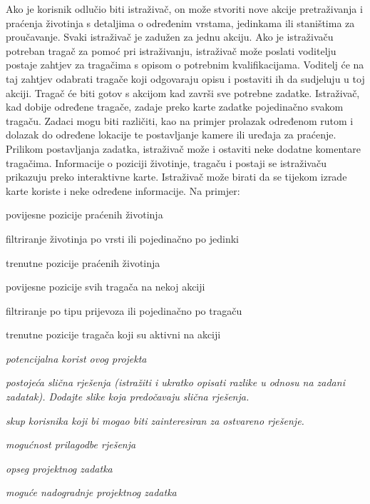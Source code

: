 	Ako je korisnik odlučio biti istraživač, on može stvoriti nove akcije pretraživanja i praćenja životinja s detaljima o određenim vrstama, jedinkama ili staništima za proučavanje.
	Svaki istraživač je zadužen za jednu akciju.
	Ako je istraživaču potreban tragač za pomoć pri istraživanju, istraživač može poslati voditelju postaje zahtjev za tragačima s opisom o potrebnim kvalifikacijama.
	Voditelj će na taj zahtjev odabrati tragače koji odgovaraju opisu i postaviti ih da sudjeluju u toj akciji.
	Tragač će biti gotov s akcijom kad završi sve potrebne zadatke.
	Istraživač, kad dobije određene tragače, zadaje preko karte zadatke pojedinačno svakom tragaču.
	Zadaci mogu biti različiti, kao na primjer prolazak određenom rutom i dolazak do određene lokacije te postavljanje kamere ili uređaja za praćenje.
	Prilikom postavljanja zadatka, istraživač može i ostaviti neke dodatne komentare tragačima.
	Informacije o poziciji životinje, tragaču i postaji se istraživaču prikazuju preko interaktivne karte.
	Istraživač može birati da se tijekom izrade karte koriste i neke određene informacije. Na primjer:
	\begin{packed_item}
		\item povijesne pozicije praćenih životinja
		\item filtriranje životinja po vrsti ili pojedinačno po jedinki
		\item trenutne pozicije praćenih životinja
		\item povijesne pozicije svih tragača na nekoj akciji
		\item filtriranje po tipu prijevoza ili pojedinačno po tragaču
		\item trenutne pozicije tragača koji su aktivni na akciji
	\end{packed_item}


	

		\begin{packed_item}
			\item \textit{potencijalna korist ovog projekta}
			\item \textit{postojeća slična rješenja (istražiti i ukratko opisati razlike u odnosu na zadani zadatak). Dodajte slike koja predočavaju slična rješenja.}
			\item \textit{skup korisnika koji bi mogao biti zainteresiran za ostvareno rješenje.}
			\item \textit{mogućnost prilagodbe rješenja }
			\item \textit{opseg projektnog zadatka}
			\item \textit{moguće nadogradnje projektnog zadatka}
		\end{packed_item}
		

	